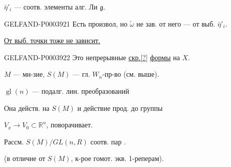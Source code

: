 $\bar\eta'_i$ --- соотв. элементы алг. Ли $\mathfrak{g}$.


\begin{GelfandAdjacentEvidence}{GELFAND-P000392}{1}
Есть произвол, но $\tilde\omega$ не зав. от него --- от выб. $\bar\eta'_i$.
\end{GelfandAdjacentEvidence}


\underline{От выб. точки тоже не зависит.}

\begin{GelfandAdjacentEvidence}{GELFAND-P000392}{2}
Это непрерывные \underline{скр.[?]} \underline{формы} на $X$.
\end{GelfandAdjacentEvidence}


$M$ --- мн-зие, $S(M)$ --- гл. $W_n$-пр-во (см. выше).

$\operatorname{gl}(n)$ --- подалг. лин. преобразований

Она действ. на $S(M)$ и действие прод. до группы

$V_x\longrightarrow V_0\subset\mathbb{R}^n$, поворачивает.

Рассм. $S(M)/GL(n,R)$ соотв. пар .


(в отличие от $S(M)$, к-рое гомот. экв. 1-реперам).

